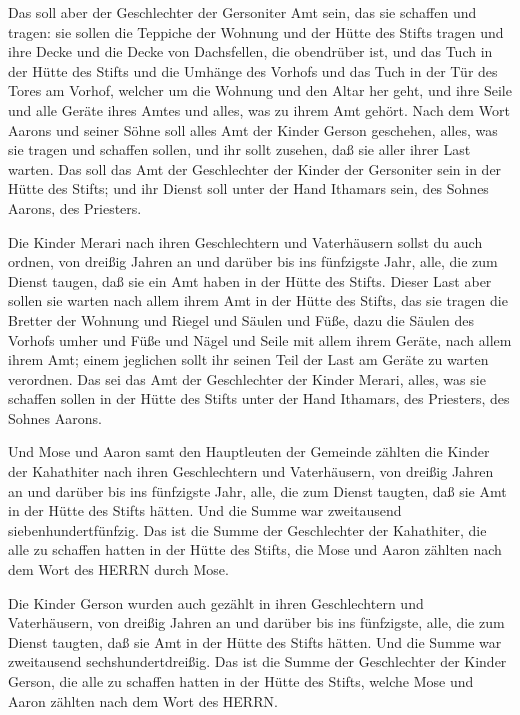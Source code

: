  Das soll aber der Geschlechter der Gersoniter Amt sein,
das sie schaffen und tragen:  sie sollen die Teppiche der
Wohnung und der Hütte des Stifts tragen und ihre Decke und die Decke von
Dachsfellen, die obendrüber ist, und das Tuch in der Hütte des Stifts
 und die Umhänge des Vorhofs und das Tuch in der Tür des
Tores am Vorhof, welcher um die Wohnung und den Altar her geht, und ihre
Seile und alle Geräte ihres Amtes und alles, was zu ihrem Amt gehört.
 Nach dem Wort Aarons und seiner Söhne soll alles Amt der
Kinder Gerson geschehen, alles, was sie tragen und schaffen sollen, und
ihr sollt zusehen, daß sie aller ihrer Last warten.  Das
soll das Amt der Geschlechter der Kinder der Gersoniter sein in der
Hütte des Stifts; und ihr Dienst soll unter der Hand Ithamars sein, des
Sohnes Aarons, des Priesters.

 Die Kinder Merari nach ihren Geschlechtern und
Vaterhäusern sollst du auch ordnen,  von dreißig Jahren an
und darüber bis ins fünfzigste Jahr, alle, die zum Dienst taugen, daß
sie ein Amt haben in der Hütte des Stifts.  Dieser Last
aber sollen sie warten nach allem ihrem Amt in der Hütte des Stifts, das
sie tragen die Bretter der Wohnung und Riegel und Säulen und Füße,
 dazu die Säulen des Vorhofs umher und Füße und Nägel und
Seile mit allem ihrem Geräte, nach allem ihrem Amt; einem jeglichen
sollt ihr seinen Teil der Last am Geräte zu warten verordnen.
 Das sei das Amt der Geschlechter der Kinder Merari, alles,
was sie schaffen sollen in der Hütte des Stifts unter der Hand Ithamars,
des Priesters, des Sohnes Aarons.

 Und Mose und Aaron samt den Hauptleuten der Gemeinde
zählten die Kinder der Kahathiter nach ihren Geschlechtern und
Vaterhäusern,  von dreißig Jahren an und darüber bis ins
fünfzigste Jahr, alle, die zum Dienst taugten, daß sie Amt in der Hütte
des Stifts hätten.  Und die Summe war zweitausend
siebenhundertfünfzig.  Das ist die Summe der Geschlechter
der Kahathiter, die alle zu schaffen hatten in der Hütte des Stifts, die
Mose und Aaron zählten nach dem Wort des HERRN durch Mose.

 Die Kinder Gerson wurden auch gezählt in ihren
Geschlechtern und Vaterhäusern,  von dreißig Jahren an und
darüber bis ins fünfzigste, alle, die zum Dienst taugten, daß sie Amt in
der Hütte des Stifts hätten.  Und die Summe war zweitausend
sechshundertdreißig.  Das ist die Summe der Geschlechter
der Kinder Gerson, die alle zu schaffen hatten in der Hütte des Stifts,
welche Mose und Aaron zählten nach dem Wort des HERRN.

